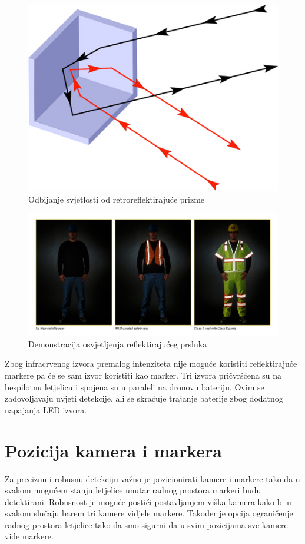 \documentclass[times, utf8, diplomski]{fer}
\begin{document}
\begin{figure}[h]
\centering
\includegraphics[width=.4\textwidth]{retroreflector}
\caption{Odbijanje svjetlosti od retroreflektirajuće prizme \protect\footnotemark}
\label{fig:retrorefleksija}
\end{figure}

\begin{figure}[h]
\centering
\includegraphics[width=.9\textwidth]{retroreflective_vest}
\caption{Demonstracija osvjetljenja reflektirajućeg prsluka \protect\footnotemark}
\label{fig:vesta}
\end{figure}

Zbog infracrvenog izvora premalog intenziteta nije moguće koristiti reflektirajuće markere pa će se sam izvor koristiti kao marker. Tri izvora pričvršćena su na bespilotnu letjelicu i spojena su u paraleli na dronovu bateriju. Ovim se zadovoljavaju uvjeti detekcije, ali se skraćuje trajanje baterije zbog dodatnog napajanja LED izvora. 

\section{Pozicija kamera i markera}
Za preciznu i robusnu detekciju važno je pozicionirati kamere i markere tako da u svakom mogućem stanju letjelice unutar radnog prostora markeri budu detektirani. Robusnost je moguće postići postavljanjem viška kamera kako bi u svakom slučaju barem tri kamere vidjele markere. Također je opcija ograničenje radnog prostora letjelice tako da smo sigurni da u svim pozicijama sve kamere vide markere. 
\end{document}
